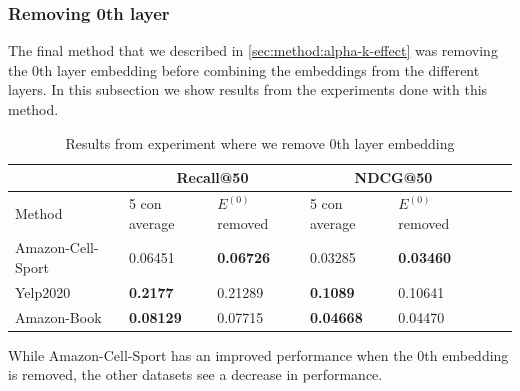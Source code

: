 \subsubsection{Removing 0th layer}
The final method that we described in \autoref{sec:method:alpha-k-effect} was removing the 0th layer embedding before combining the embeddings from the different layers.
In this subsection we show results from the experiments done with this method.
\begin{table}[h!]
    \centering
    \begin{tabular}{|l|l|l||l|l||l|l|}
        \hline
                            & \multicolumn{2}{c||}{Recall@50}           & \multicolumn{2}{c||}{NDCG@50}             \\ \hline
        Method              & 5 con average     & $E^{(0)}$ removed     & 5 con average       & $E^{(0)}$ removed   \\ \hline
        Amazon-Cell-Sport   & 0.06451           & \textbf{0.06726}      & 0.03285             & \textbf{0.03460}             \\ \hline
        Yelp2020            & \textbf{0.2177}   & 0.21289               & \textbf{0.1089}     & 0.10641            \\ \hline
        Amazon-Book         & \textbf{0.08129}  & 0.07715               & \textbf{0.04668}    & 0.04470            \\ \hline
    \end{tabular}
    \label{tab:removing-0th-layer-embedding-experiment}
    \caption{Results from experiment where we remove 0th layer embedding}
\end{table}
While Amazon-Cell-Sport has an improved performance when the 0th embedding is removed, the other datasets see a decrease in performance.
